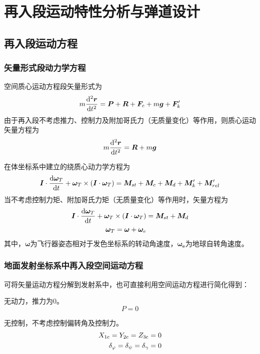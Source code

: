 \chapter{再入段运动特性分析与弹道设计}
\thispagestyle{empty}

\section{再入段运动方程}

\subsection{矢量形式段动力学方程}

空间质心运动方程段矢量形式为
\begin{equation}
	m \dfrac{{\rm{d}}^2 \bm{r}}{{\rm{d}} t^2} = \bm{P} + \bm{R} + \bm{F}_{c} +m\bm{g} + \bm{F}'_k
\end{equation}
由于再入段不考虑推力、控制力及附加哥氏力（无质量变化）等作用，则质心运动矢量方程为
\begin{equation}
	m \dfrac{{\rm{d}}^2 \bm{r}}{{\rm{d}} t^2} = \bm{R} + m\bm{g}
\end{equation}

在体坐标系中建立的绕质心动力学方程为
\begin{equation}
	\bm{I}\cdot \dfrac{{\rm{d}} \bm{\omega}_T}{{\rm{d}} t} + \bm{\omega}_T\times(\bm{I}\cdot \bm{\omega}_T) = \bm{M}_{st} + \bm{M}_c + \bm{M}_d + \bm{M}'_k+\bm{M}'_{rel}
\end{equation}
当不考虑控制力矩、附加哥氏力矩（无质量变化）等作用时，矢量方程为
\begin{align}
	\bm{I}\cdot \dfrac{{\rm{d}} \bm{\omega}_T}{{\rm{d}} t} + \bm{\omega}_T\times(\bm{I}\cdot \bm{\omega}_T) &= \bm{M}_{st} + \bm{M}_d \\
	\bm{\omega}_T = \bm{\omega} + \bm{\omega}_e
\end{align}
其中，$\bm{\omega}$为飞行器姿态相对于发色坐标系的转动角速度，$\bm{\omega_e}$为地球自转角速度。


\subsection{地面发射坐标系中再入段空间运动方程}
可将矢量运动方程分解到发射系中，也可直接利用空间运动方程进行简化得到：

\noa[1] 无动力，推力为0。
\begin{equation}
	P = 0
\end{equation}

\noa[2] 无控制，不考虑控制偏转角及控制力。
\begin{align}
	X_{\text{1\text{c}}} = Y_{2\text{c}} = Z_{3\text{c}} = 0\\
	\delta_\varphi = \delta_\psi = \delta_\gamma = 0
\end{align}

